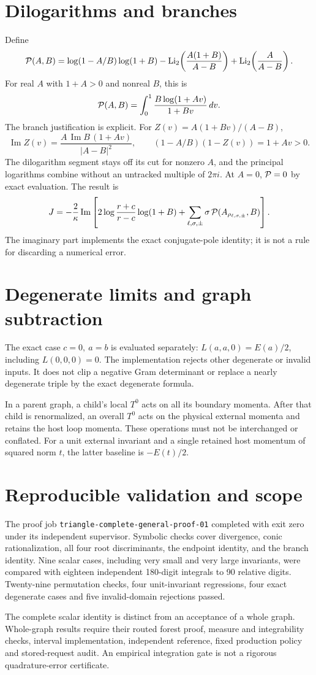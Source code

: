 \documentclass[11pt]{article}
\begin{document}
\section*{Dilogarithms and branches}
Define
\[
 {\cal P}(A,B)=\log(1-A/B)\log(1+B)
 -\operatorname{Li}_2\!\left(\frac{A(1+B)}{A-B}\right)
 +\operatorname{Li}_2\!\left(\frac{A}{A-B}\right).
\]
For real \(A\) with \(1+A>0\) and nonreal \(B\), this is
\[
 {\cal P}(A,B)=\int_0^1\frac{B\log(1+Av)}{1+Bv}\,dv .
\]
The branch justification is explicit. For
\(Z(v)=A(1+Bv)/(A-B)\),
\[
 \operatorname{Im}Z(v)
 =\frac{A\,\operatorname{Im}B\,(1+Av)}{|A-B|^2},\qquad
 (1-A/B)(1-Z(v))=1+Av>0 .
\]
The dilogarithm segment stays off its cut for nonzero \(A\), and the
principal logarithms combine without an untracked multiple of \(2\pi i\).
At \(A=0\), \({\cal P}=0\) by exact evaluation.
The result is
\[
 J=-\frac{2}{\kappa}\operatorname{Im}\left[
 2\log\frac{r+c}{r-c}\log(1+B)
 +\sum_{\ell,\sigma,\pm}
     \sigma\,{\cal P}(A_{\rho_{\ell,\sigma,\pm}},B)\right].
\]
The imaginary part implements the exact conjugate-pole identity; it is
not a rule for discarding a numerical error.

\section*{Degenerate limits and graph subtraction}
The exact case \(c=0,\ a=b\) is evaluated separately:
\(L(a,a,0)=E(a)/2\), including \(L(0,0,0)=0\).
The implementation rejects other degenerate or invalid inputs.
It does not clip a negative Gram determinant or replace a nearly
degenerate triple by the exact degenerate formula.

In a parent graph, a child's local \(T^0\) acts on all its boundary
momenta. After that child is renormalized, an overall \(T^0\) acts on
the physical external momenta and retains the host loop momenta.
These operations must not be interchanged or conflated.
For a unit external invariant and a single retained host momentum
of squared norm \(t\), the latter baseline is \(-E(t)/2\).

\section*{Reproducible validation and scope}
The proof job \texttt{triangle-complete-general-proof-01} completed
with exit zero under its independent supervisor.
Symbolic checks cover divergence, conic rationalization, all four
root discriminants, the endpoint identity, and the branch identity.
Nine scalar cases, including very small and very large invariants,
were compared with eighteen independent 180-digit integrals to
90 relative digits. Twenty-nine permutation checks, four unit-invariant
regressions, four exact degenerate cases and five invalid-domain
rejections passed.

The complete scalar identity is distinct from an acceptance of a
whole graph. Whole-graph results require their routed forest proof,
measure and integrability checks, interval implementation, independent
reference, fixed production policy and stored-request audit.
An empirical integration gate is not a rigorous quadrature-error
certificate.
\end{document}
